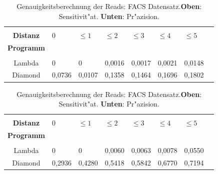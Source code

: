 \documentclass[10pt, a4paper]{article}[08.12.2015]
\begin{document}
         \begin{table}[H]
        \begin{tabular}{clllllll}
          &&&&&&\\
          \textbf{Distanz}&0&$\leq1$&$\leq2$&$\leq3$&$\leq4$&$\leq5$\\
          \textbf{Programm}&&&&&\\ \hline  
          &&&&&&\\
          Lambda&0&0&0,0016&0,0017&0,0021&0,0148\\
          Diamond&0,0736&0,0107&0,1358&0,1464&0,1696&0,1802\\
        \end{tabular}

        \begin{tabular}{clllllll}
        &&&&&&\\
          \textbf{Distanz}&0&$\leq1$&$\leq2$&$\leq3$&$\leq4$&$\leq5$\\
          \textbf{Programm}&&&&&\\ \hline  
          &&&&&&\\
          Lambda&0&0&0,0060&0,0063&0,0078&0,0550\\
          Diamond&0,2936&0,4280&0,5418&0,5842&0,6770&0,7194\\
        \end{tabular}
        \newline
        \caption[Genauigkeitsberechnung der Reads: FACS Datensatz.]{\small{Genauigkeitsberechnung der Reads: FACS Datensatz.\newline \textbf{Oben}: Sensitivit"at. \textbf{Unten}: Pr"azision.} }
         \end{table}
\end{document}
